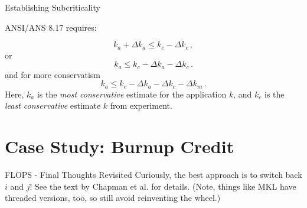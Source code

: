\documentclass[10pt]{beamer}
\begin{document}
\begin{frame}{Establishing Subcriticality}

ANSI/ANS 8.17 requires:

\begin{equation}
 k_a + \Delta k_a \leq k_c - \Delta k_c \, ,
\end{equation}
or
\begin{equation}
 k_a \leq k_c  - \Delta k_a - \Delta k_c \, .
\end{equation}
and for more conservatism
\begin{equation}
 k_a \leq k_c - \Delta k_a - \Delta k_c - \Delta k_m \, .
\end{equation}
Here, $k_a$ is the {\it most conservative} estimate for the application $k$,
and $k_c$ is the {\it least conservative} estimate $k$ from experiment.

\end{frame}


\section{Case Study: Burnup Credit}




\begin{frame}[fragile]{FLOPS - Final Thoughts Revisited}
  \vfill
  Curiously, the best approach is to switch back $i$ and $j$!  See the text 
  by Chapman et al. for details. (Note, things like MKL have threaded versions,
  too, so still avoid reinventing the wheel.)
\end{frame}
\end{document}
